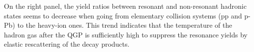 \documentclass[ALICE,manyauthors]{cernphprep}
\begin{document}
On the right panel, the yield ratios between resonant and non-resonant hadronic states seems to decrease when going from elementary collision systems (pp and p-Pb) to the heavy-ion ones. This trend indicates that the temperature of the hadron gas after the QGP is sufficiently high to suppress the resonance yields by elastic rescattering of the decay products.

\end{document}
